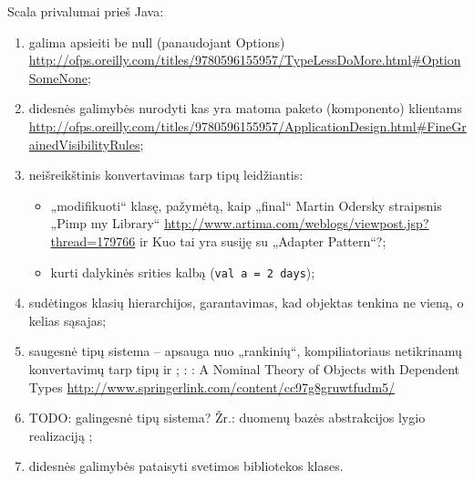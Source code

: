Scala privalumai prieš Java:
\begin{enumerate}
  \item galima apsieiti be null (panaudojant Options)
    \url{http://ofps.oreilly.com/titles/9780596155957/TypeLessDoMore.html#OptionSomeNone};
  \item didesnės galimybės nurodyti kas yra matoma paketo (komponento)
    klientams
    \url{http://ofps.oreilly.com/titles/9780596155957/ApplicationDesign.html#FineGrainedVisibilityRules};
  \item neišreikštinis konvertavimas tarp tipų leidžiantis:
    \begin{itemize}
      \item „modifikuoti“ klasę, pažymėtą, kaip „final“
        Martin Odersky straipsnis „Pimp my Library“
        \url{http://www.artima.com/weblogs/viewpost.jsp?thread=179766}
        ir \cite[173]{beginning-scala}
        \TODO Kuo tai yra susiję su „Adapter Pattern“?;
      \item kurti dalykinės srities kalbą\cite[175]{beginning-scala}
        (\verb|val a = 2 days|);
    \end{itemize}
  \item sudėtingos klasių hierarchijos, garantavimas, kad objektas
    tenkina ne vieną, o kelias sąsajas\cite[184]{beginning-scala};
  \item saugesnė tipų sistema – apsauga nuo „rankinių“,
    kompiliatoriaus netikrinamų konvertavimų tarp tipų
    \cite[172]{beginning-scala} ir
     \cite[207]{beginning-scala};
    \TODO: \cite{scala:type-checking}
    \TODO: A Nominal Theory of Objects with Dependent Types
    \url{http://www.springerlink.com/content/cc97g8gruwtfudm5/}
  \item TODO: galingesnė tipų sistema? Žr.: duomenų bazės abstrakcijos
    lygio realizaciją \cite[190]{beginning-scala};
  \item didesnės galimybės pataisyti svetimos bibliotekos klases.
\end{enumerate}

